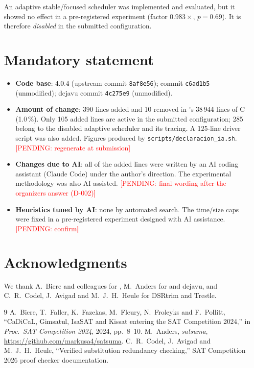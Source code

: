 \documentclass[conference]{IEEEtran}
\newcommand{\pendiente}[1]{\textcolor{red}{[PENDING: #1]}}
\begin{document}
An adaptive stable/focused scheduler was implemented and evaluated, but it
showed no effect in a pre-registered experiment (factor $0.983\times$,
$p=0.69$). It is therefore \emph{disabled} in the submitted configuration.

\section{Mandatory statement}

\begin{itemize}
  \item \textbf{Code base}: \kissat{} 4.0.4 (upstream commit
        \texttt{8af8e56}); \satsuma{} commit \texttt{c6ad1b5} (unmodified);
        dejavu commit \texttt{4c275e9} (unmodified).
  \item \textbf{Amount of change}: 390 lines added and 10 removed in
        \kissat{}'s 38\,944 lines of C (1.0\,\%). Only 105 added lines are
        active in the submitted configuration; 285 belong to the disabled
        adaptive scheduler and its tracing. A 125-line driver script was also
        added. Figures produced by \texttt{scripts/declaracion\_ia.sh}.
        \pendiente{regenerate at submission}
  \item \textbf{Changes due to AI}: all of the added lines were written by
        an AI coding assistant (Claude Code) under the author's direction.
        The experimental methodology was also AI-assisted.
        \pendiente{final wording after the organizers answer (D-002)}
  \item \textbf{Heuristics tuned by AI}: none by automated search. The
        \satsuma{} time/size caps were fixed in a pre-registered experiment
        designed with AI assistance. \pendiente{confirm}
\end{itemize}

\section*{Acknowledgments}
We thank A.~Biere and colleagues for \kissat{}, M.~Anders for \satsuma{} and
dejavu, and C.~R.~Codel, J.~Avigad and M.~J.~H.~Heule for DSRtrim and
Trestle.

\begin{thebibliography}{9}
 A.~Biere, T.~Faller, K.~Fazekas, M.~Fleury, N.~Froleyks and
  F.~Pollitt, ``CaDiCaL, Gimsatul, IsaSAT and Kissat entering the SAT
  Competition 2024,'' in \emph{Proc.\ SAT Competition 2024}, 2024, pp.~8--10.
 M.~Anders, \emph{satsuma}, \url{https://github.com/markusa4/satsuma}.
 C.~R.~Codel, J.~Avigad and M.~J.~H.~Heule, ``Verified
  substitution redundancy checking,'' SAT Competition 2026 proof checker
  documentation.
\end{thebibliography}
\end{document}
